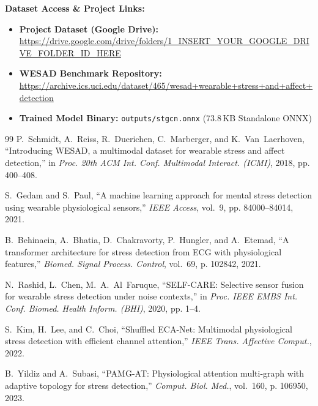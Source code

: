 \documentclass[11pt,a4paper]{article}
\begin{document}
\vspace{0.3cm}
\noindent\textbf{Dataset Access \& Project Links:}
\begin{itemize}
    \item \textbf{Project Dataset (Google Drive):} \url{https://drive.google.com/drive/folders/1_INSERT_YOUR_GOOGLE_DRIVE_FOLDER_ID_HERE}
    \item \textbf{WESAD Benchmark Repository:} \url{https://archive.ics.uci.edu/dataset/465/wesad+wearable+stress+and+affect+detection}
    \item \textbf{Trained Model Binary:} \texttt{outputs/stgcn.onnx} (73.8\,KB Standalone ONNX)
\end{itemize}

\begin{thebibliography}{99}
P.~Schmidt, A.~Reiss, R.~Duerichen, C.~Marberger, and K.~Van~Laerhoven, ``Introducing WESAD, a multimodal dataset for wearable stress and affect detection,'' in \emph{Proc. 20th ACM Int. Conf. Multimodal Interact. (ICMI)}, 2018, pp. 400--408.

S.~Gedam and S.~Paul, ``A machine learning approach for mental stress detection using wearable physiological sensors,'' \emph{IEEE Access}, vol.~9, pp. 84000--84014, 2021.

B.~Behinaein, A.~Bhatia, D.~Chakravorty, P.~Hungler, and A.~Etemad, ``A transformer architecture for stress detection from ECG with physiological features,'' \emph{Biomed. Signal Process. Control}, vol.~69, p. 102842, 2021.

N.~Rashid, L.~Chen, M.~A.~Al~Faruque, ``SELF-CARE: Selective sensor fusion for wearable stress detection under noise contexts,'' in \emph{Proc. IEEE EMBS Int. Conf. Biomed. Health Inform. (BHI)}, 2020, pp. 1--4.

S.~Kim, H.~Lee, and C.~Choi, ``Shuffled ECA-Net: Multimodal physiological stress detection with efficient channel attention,'' \emph{IEEE Trans. Affective Comput.}, 2022.

B.~Yildiz and A.~Subasi, ``PAMG-AT: Physiological attention multi-graph with adaptive topology for stress detection,'' \emph{Comput. Biol. Med.}, vol.~160, p. 106950, 2023.
\end{thebibliography}
\end{document}
